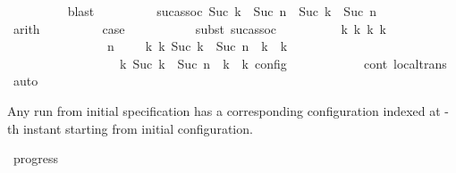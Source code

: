 \begin{isabellebody}
\ \ \ \ \ \ \ \ \isamarkupfalse%
\ blast\isanewline
\ \ \ \ \ \ \isamarkupfalse%
\ \isamarkupfalse%
\ suc{\isacharunderscore}assoc{\isacharcolon}\ {\isacartoucheopen}Suc\ {\isasymdelta}k\ {\isacharplus}\ Suc\ n\ {\isacharequal}\ Suc\ {\isacharparenleft}{\isasymdelta}k\ {\isacharplus}\ Suc\ n{\isacharparenright}{\isacartoucheclose}\isanewline
\ \ \ \ \ \ \ \ \isamarkupfalse%
\ arith\isanewline
\ \ \ \ \ \ \isamarkupfalse%
\ \isamarkupfalse%
\ {\isacharquery}case\ \isanewline
\ \ \ \ \ \ \ \ \isamarkupfalse%
\ {\isacharparenleft}subst\ suc{\isacharunderscore}assoc{\isacharparenright}\isanewline
\ \ \ \ \ \ \ \ \isamarkupfalse%
\ {\isacartoucheopen}{\isasymexists}{\isasymGamma}\isactrlsub k\ {\isasymPsi}\isactrlsub k\ {\isasymPhi}\isactrlsub k\ k{\isachardot}\isanewline
\ \ \ \ \ \ \ \ \ \ \ \ \ \ \ {\isacharparenleft}{\isacharparenleft}{\isasymGamma}{\isacharcomma}\ n\ {\isasymturnstile}\ {\isasymPsi}\ {\isasymtriangleright}\ {\isasymPhi}{\isacharparenright}\ {\isasymhookrightarrow}\isactrlbsup k\isactrlesup \ {\isacharparenleft}{\isasymGamma}\isactrlsub k{\isacharcomma}\ Suc\ {\isacharparenleft}{\isasymdelta}k\ {\isacharplus}\ Suc\ n{\isacharparenright}\ {\isasymturnstile}\ {\isasymPsi}\isactrlsub k\ {\isasymtriangleright}\ {\isasymPhi}\isactrlsub k{\isacharparenright}{\isacharparenright}\isanewline
\ \ \ \ \ \ \ \ \ \ \ \ \ \ {\isasymand}\ {\isasymrho}\ {\isasymin}\ {\isasymlbrakk}\ {\isasymGamma}\isactrlsub k{\isacharcomma}\ Suc\ {\isasymdelta}k\ {\isacharplus}\ Suc\ n\ {\isasymturnstile}\ {\isasymPsi}\isactrlsub k\ {\isasymtriangleright}\ {\isasymPhi}\isactrlsub k\ {\isasymrbrakk}\isactrlsub c\isactrlsub o\isactrlsub n\isactrlsub f\isactrlsub i\isactrlsub g{\isacartoucheclose}\isanewline
\ \ \ \ \ \ \ \ \ \ \isamarkupfalse%
\ cont{}\ local{\isachardot}trans\ \isamarkupfalse%
\ auto\isanewline
\ \ \ \ \ \ \ \ \isamarkupfalse%
\isanewline
\ \ \isamarkupfalse%
\isanewline
{}\isamarkupfalse%
%
\endisatagproof
{\isafoldproof}%
%
\isadelimproof
%
\endisadelimproof
%
\begin{isamarkuptext}%
Any run from initial specification \isa{{\isasymPsi}} has a corresponding configuration
  indexed at -th instant starting from initial configuration.%
\end{isamarkuptext}\isamarkuptrue%
\isamarkupfalse%
\ progress{\isacharcolon}\isanewline

\end{isabellebody}
